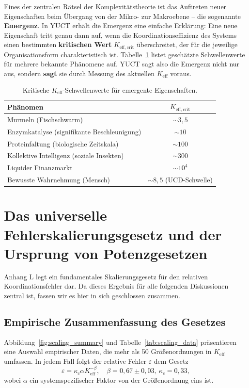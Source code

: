 \documentclass[11pt]{article}
\theoremstyle{remark}
\newcommand{\Keff}{K_{\mathrm{eff}}}
\newcommand{\Keffcrit}{K_{\mathrm{eff},\text{crit}}}
\begin{document}
	Eines der zentralen Rätsel der Komplexitätstheorie ist das Auftreten neuer Eigenschaften beim Übergang von der Mikro- zur Makroebene – die sogenannte \textbf{Emergenz}. In YUCT erhält die Emergenz eine einfache Erklärung: Eine neue Eigenschaft tritt genau dann auf, wenn die Koordinationseffizienz des Systems einen bestimmten \textbf{kritischen Wert} \(\Keffcrit\) überschreitet, der für die jeweilige Organisationsform charakteristisch ist. Tabelle~\ref{tab:thresholds} listet geschätzte Schwellenwerte für mehrere bekannte Phänomene auf. YUCT sagt also die Emergenz nicht nur aus, sondern \textbf{sagt} sie durch Messung des aktuellen \(\Keff\) voraus.
	
	\begin{table}[H]
		\centering
		\caption{Kritische \(\Keff\)-Schwellenwerte für emergente Eigenschaften.}
		\label{tab:thresholds}
		\begin{tabular}{l c}
			\toprule
			\textbf{Phänomen} & \(\Keffcrit\) \\
			\midrule
			Murmeln (Fischschwarm) & \(\sim 3,5\) \\
			Enzymkatalyse (signifikante Beschleunigung) & \(\sim 10\) \\
			Proteinfaltung (biologische Zeitskala) & \(\sim 100\) \\
			Kollektive Intelligenz (soziale Insekten) & \(\sim 300\) \\
			Liquider Finanzmarkt & \(\sim 10^4\) \\
			Bewusste Wahrnehmung (Mensch) & \(\sim 8,5\) (UCD-Schwelle) \\
			\bottomrule
		\end{tabular}
	\end{table}
	
	\section{Das universelle Fehlerskalierungsgesetz und der Ursprung von Potenzgesetzen}
	\label{sec:scaling}
	
	Anhang L legt ein fundamentales Skalierungsgesetz für den relativen Koordinationsfehler dar. Da dieses Ergebnis für alle folgenden Diskussionen zentral ist, fassen wir es hier in sich geschlossen zusammen.
	
	\subsection{Empirische Zusammenfassung des Gesetzes}
	
	Abbildung~\ref{fig:scaling_summary} und Tabelle~\ref{tab:scaling_data} präsentieren eine Auswahl empirischer Daten, die mehr als 50 Größenordnungen in \(\Keff\) umfassen. In jedem Fall folgt der relative Fehler \(\varepsilon\) dem Gesetz
	\begin{equation}
		\varepsilon = \kappa_c \alpha \Keff^{-\beta}, \quad \beta = 0,67 \pm 0,03,\ \kappa_c = 0,33,
		\label{eq:error-scaling}
	\end{equation}
	wobei \(\alpha\) ein systemspezifischer Faktor von der Größenordnung eins ist.
	
\end{document}

